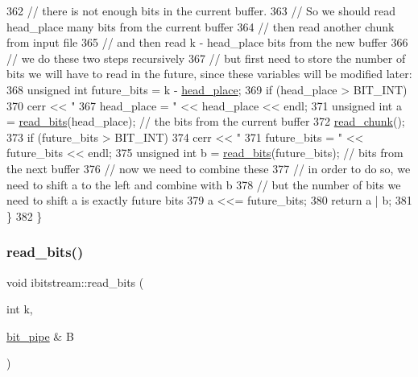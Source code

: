 \begin{DoxyCode}
362     \textcolor{comment}{// there is not enough bits in the current buffer.}
363     \textcolor{comment}{// So we should read head\_place many bits from the current buffer}
364     \textcolor{comment}{// then read another chunk from input file}
365     \textcolor{comment}{// and then read k - head\_place bits from the new buffer}
366     \textcolor{comment}{// we do these two steps recursively}
367     \textcolor{comment}{// but first need to store the number of bits we will have to read in the future, since these variables
       will be modified later:}
368     \textcolor{keywordtype}{unsigned} \textcolor{keywordtype}{int} future\_bits = k - \hyperlink{classibitstream_a7b96359ac1534a5565e6e9b0cc53a0b3}{head\_place};
369     \textcolor{keywordflow}{if} (head\_place > BIT\_INT)
370       cerr << \textcolor{stringliteral}{" 367 head\_place = "} << head\_place << endl;
371     \textcolor{keywordtype}{unsigned} \textcolor{keywordtype}{int} a = \hyperlink{classibitstream_a2fdcaecf10fefa6942dcd5286a2696e0}{read\_bits}(head\_place); \textcolor{comment}{// the bits from the current buffer}
372     \hyperlink{classibitstream_ac62c26004436d83f337f4aeba0895e20}{read\_chunk}();
373     \textcolor{keywordflow}{if} (future\_bits > BIT\_INT)
374       cerr << \textcolor{stringliteral}{" 371 future\_bits = "} << future\_bits << endl;
375     \textcolor{keywordtype}{unsigned} \textcolor{keywordtype}{int} b = \hyperlink{classibitstream_a2fdcaecf10fefa6942dcd5286a2696e0}{read\_bits}(future\_bits); \textcolor{comment}{// bits from the next buffer}
376     \textcolor{comment}{// now we need to combine these}
377     \textcolor{comment}{// in order to do so, we need to shift a to the left and combine with b}
378     \textcolor{comment}{// but the number of bits we need to shift a is exactly future bits}
379     a <<= future\_bits;
380     \textcolor{keywordflow}{return} a | b;
381   \}
382 \}
\end{DoxyCode}
\mbox{\label{classibitstream_a4bb7a698ab44c1e2fe21b4daa880bd6c}} 
\subsubsection{\texorpdfstring{read\+\_\+bits()}{read\_bits()}\hspace{0.1cm}{\footnotesize\ttfamily [2/2]}}
{\footnotesize\ttfamily void ibitstream\+::read\+\_\+bits (\begin{DoxyParamCaption}\item[{int}]{k,  }\item[{\hyperlink{classbit__pipe}{bit\+\_\+pipe} \&}]{B }\end{DoxyParamCaption})}



